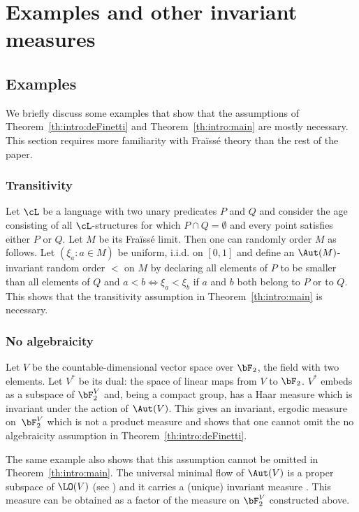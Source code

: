 \section{Examples and other invariant measures}
\label{sec:examples}

\subsection{Examples}
\label{sec:examples-1}

We briefly discuss some examples that show that the assumptions of Theorem~\ref{th:intro:deFinetti} and Theorem~\ref{th:intro:main} are mostly necessary. This section requires more familiarity with Fraïssé theory than the rest of the paper.\enlargethispage{.5\baselineskip}%

\subsubsection{Transitivity} Let $\cL$ be a language with two unary predicates $P$ and $Q$ and consider the age consisting of all $\cL$-structures for which $P \cap Q = \emptyset$ and every point satisfies either $P$ or $Q$. Let $M$ be its Fraïssé limit. Then one can randomly order $M$ as follows. Let $(\xi_a : a \in M)$ be uniform, i.i.d. on $[0, 1]$ and define an $\Aut(M)$-invariant random order $<$ on $M$ by declaring all elements of $P$ to be smaller than all elements of $Q$ and $a < b \iff \xi_a < \xi_b$ if $a$ and $b$ both belong to $P$ or to $Q$. This shows that the transitivity assumption in Theorem~\ref{th:intro:main} is necessary.

\subsubsection{No algebraicity} Let $V$ be the countable-dimensional vector space over $\bF_2$, the field with two elements. Let $V^*$ be its dual: the space of linear maps from $V$ to $\bF_2$. $V^*$ embeds as a subspace of $\bF_2^V$ and, being a compact group, has a Haar measure which is invariant under the action of $\Aut(V)$. This gives an invariant, ergodic measure on~$\bF_2^V$ which is not a product measure and shows that one cannot omit the no algebraicity assumption in Theorem~\ref{th:intro:deFinetti}.

The same example also shows that this assumption cannot be omitted in Theorem~\ref{th:intro:main}. The universal minimal flow of $\Aut(V)$ is a proper subspace of $\LO(V)$ (see \cite[Th.\,8.2]{Kechris2005}) and it carries a (unique) invariant measure \cite[\S10]{Angel2014}. This measure can be obtained as a factor of the measure on $\bF_2^V$ constructed above.


